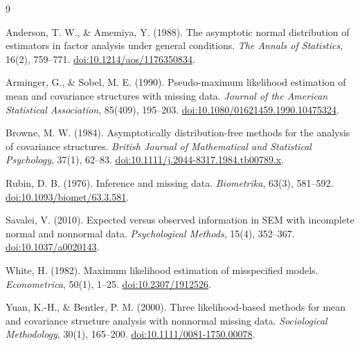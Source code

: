 \documentclass[11pt]{article}
\theoremstyle{plain}
\theoremstyle{remark}
\begin{document}
\begin{thebibliography}{9}

Anderson, T. W., \& Amemiya, Y. (1988).
The asymptotic normal distribution of estimators in factor analysis under
general conditions.
\emph{The Annals of Statistics}, 16(2), 759--771.
\href{https://doi.org/10.1214/aos/1176350834}{doi:10.1214/aos/1176350834}.

Arminger, G., \& Sobel, M. E. (1990).
Pseudo-maximum likelihood estimation of mean and covariance structures with
missing data.
\emph{Journal of the American Statistical Association}, 85(409), 195--203.
\href{https://doi.org/10.1080/01621459.1990.10475324}{doi:10.1080/01621459.1990.10475324}.

Browne, M. W. (1984).
Asymptotically distribution-free methods for the analysis of covariance
structures.
\emph{British Journal of Mathematical and Statistical Psychology}, 37(1),
62--83.
\href{https://doi.org/10.1111/j.2044-8317.1984.tb00789.x}{doi:10.1111/j.2044-8317.1984.tb00789.x}.

Rubin, D. B. (1976).
Inference and missing data.
\emph{Biometrika}, 63(3), 581--592.
\href{https://doi.org/10.1093/biomet/63.3.581}{doi:10.1093/biomet/63.3.581}.

Savalei, V. (2010).
Expected versus observed information in SEM with incomplete normal and
nonnormal data.
\emph{Psychological Methods}, 15(4), 352--367.
\href{https://doi.org/10.1037/a0020143}{doi:10.1037/a0020143}.

White, H. (1982).
Maximum likelihood estimation of misspecified models.
\emph{Econometrica}, 50(1), 1--25.
\href{https://doi.org/10.2307/1912526}{doi:10.2307/1912526}.

Yuan, K.-H., \& Bentler, P. M. (2000).
Three likelihood-based methods for mean and covariance structure analysis with
nonnormal missing data.
\emph{Sociological Methodology}, 30(1), 165--200.
\href{https://doi.org/10.1111/0081-1750.00078}{doi:10.1111/0081-1750.00078}.

\end{thebibliography}
\end{document}
